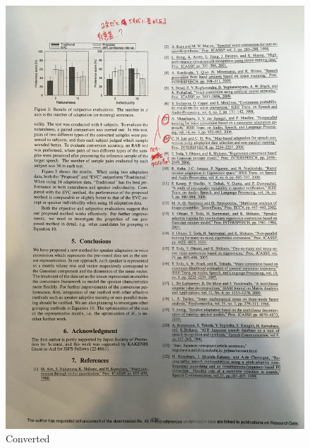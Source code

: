 \documentclass[a4paper, dvipdfmx]{jarticle}
\begin{document}
\begin{figure}[t]
\begin{minipage}{0.33\columnwidth}
        \includegraphics[clip, width=\linewidth]{fig/converted.jpg}
        {\footnotesize Converted}
    \end{minipage}%
    \begin{minipage}{0.33\columnwidth}
        \centering

\end{minipage}
\end{figure}
\end{document}
